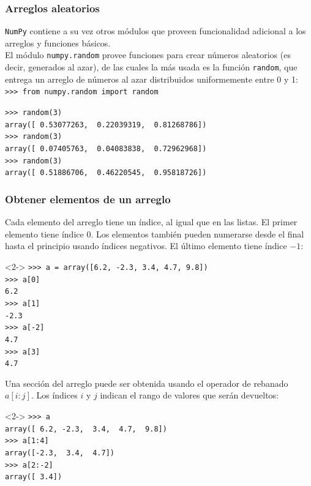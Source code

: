 \begin{frame}[fragile]
\frametitle{Arreglos aleatorios}
\texttt{NumPy} contiene a su vez otros módulos que proveen funcionalidad adicional a los arreglos y funciones básicos.
\\
\bigskip
El módulo \texttt{numpy.random} provee funciones para crear números aleatorios (es decir, generados al azar), de las cuales la más usada es la función \texttt{random}, que entrega un arreglo de números al azar distribuidos uniformemente entre 0 y 1:
\\
\bigskip
\verb|>>> from numpy.random import random|
\end{frame}
\begin{frame}[fragile]
\fontsize{12}{12}\selectfont
\begin{exampleblock}{}
\verb|>>> random(3)| \\
\pause
\verb|array([ 0.53077263,  0.22039319,  0.81268786])| \\
\verb|>>> random(3)| \\
\pause
\verb|array([ 0.07405763,  0.04083838,  0.72962968])| \\
\pause
\verb|>>> random(3)| \\
\pause
\verb|array([ 0.51886706,  0.46220545,  0.95818726])|
\end{exampleblock}
\end{frame}
\begin{frame}[fragile]
\frametitle{Obtener elementos de un arreglo}
Cada elemento del arreglo tiene un índice, al igual que en las listas. El primer elemento tiene índice $0$. Los elementos también pueden numerarse desde el final hasta el principio usando índices negativos. El último elemento tiene índice $-1$:
\fontsize{12}{12}\selectfont
\begin{exampleblock}{}<2->
\verb|>>> a = array([6.2, -2.3, 3.4, 4.7, 9.8])| \\
\pause
\verb|>>> a[0]| \\
\pause
\verb|6.2| \\
\pause
\verb|>>> a[1]| \\
\pause
\verb|-2.3| \\
\pause
\verb|>>> a[-2]| \\
\pause
\verb|4.7| \\
\pause
\verb|>>> a[3]| \\
\pause
\verb|4.7|
\end{exampleblock}
\end{frame}
\begin{frame}[fragile]
Una sección del arreglo puede ser obtenida usando el operador de rebanado $a[i:j]$. Los índices $i$ y $j$ indican el rango de valores que serán devueltos:
\begin{exampleblock}{}<2->
\verb|>>> a| \\
\pause
\verb|array([ 6.2, -2.3,  3.4,  4.7,  9.8])| \\
\pause
\verb|>>> a[1:4]| \\
\pause
\verb|array([-2.3,  3.4,  4.7])| \\
\pause
\verb|>>> a[2:-2]| \\
\pause
\verb|array([ 3.4])|
\end{exampleblock}
\end{frame}
